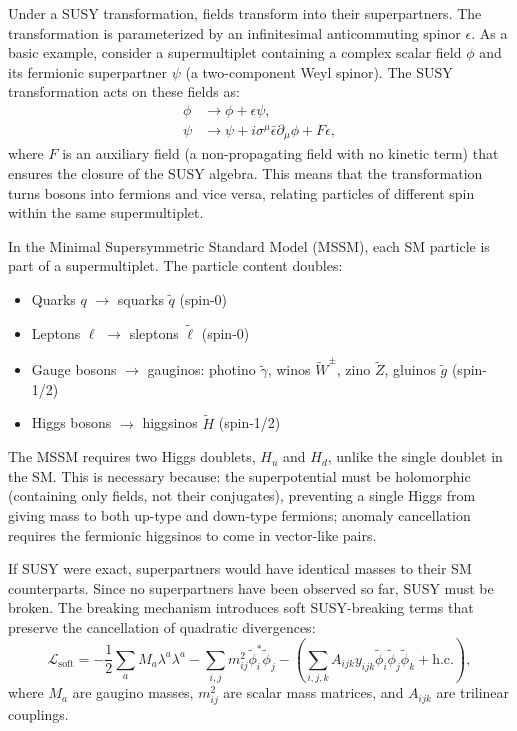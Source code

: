 Under a SUSY transformation, fields transform into their superpartners. The transformation is parameterized by an infinitesimal anticommuting spinor $\epsilon$. As a basic example, consider a supermultiplet containing a complex scalar field $\phi$ and its fermionic superpartner $\psi$ (a two-component Weyl spinor). The SUSY transformation acts on these fields as:
\begin{align}
\phi &\to \phi + \epsilon \psi, \\
\psi &\to \psi + i\sigma^\mu \bar{\epsilon} \partial_\mu \phi + F\epsilon,
\end{align}
where $F$ is an auxiliary field (a non-propagating field with no kinetic term) that ensures the closure of the SUSY algebra. This means that the transformation turns bosons into fermions and vice versa, relating particles of different spin within the same supermultiplet.


In the Minimal Supersymmetric Standard Model (MSSM), each SM particle is part of a supermultiplet. The particle content doubles:

\begin{itemize}
\item Quarks $q$ $\to$ squarks $\tilde{q}$ (spin-0)
\item Leptons $\ell$ $\to$ sleptons $\tilde{\ell}$ (spin-0)
\item Gauge bosons $\to$ gauginos: photino $\tilde{\gamma}$, winos $\tilde{W}^\pm$, zino $\tilde{Z}$, gluinos $\tilde{g}$ (spin-1/2)
\item Higgs bosons $\to$ higgsinos $\tilde{H}$ (spin-1/2)
\end{itemize}

The MSSM requires two Higgs doublets, $H_u$ and $H_d$, unlike the single doublet in the SM. This is necessary because: the superpotential must be holomorphic (containing only fields, not their conjugates), preventing a single Higgs from giving mass to both up-type and down-type fermions; anomaly cancellation requires the fermionic higgsinos to come in vector-like pairs.

If SUSY were exact, superpartners would have identical masses to their SM counterparts. Since no superpartners have been observed so far, SUSY must be broken. The breaking mechanism introduces soft SUSY-breaking terms that preserve the cancellation of quadratic divergences:
\begin{equation}
\mathcal{L}_{\text{soft}} = -\frac{1}{2} \sum_a M_a \lambda^a \lambda^a - \sum_{i,j} m^2_{ij} \tilde{\phi}_i^* \tilde{\phi}_j - \left( \sum_{i,j,k} A_{ijk} y_{ijk} \tilde{\phi}_i \tilde{\phi}_j \tilde{\phi}_k + \text{h.c.} \right),
\end{equation}
where $M_a$ are gaugino masses, $m^2_{ij}$ are scalar mass matrices, and $A_{ijk}$ are trilinear couplings.

